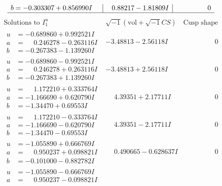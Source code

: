 \documentclass[1p]{elsarticle_modified}
\theoremstyle{definition}
\newcommand{\I}{\sqrt{-1}}
\begin{document}
$$\begin{array}{c|c|c}
\begin{aligned}
b &= -0.303307 + 0.856990 I\end{aligned}
 & \phantom{-}0.88217 - 1.81809 I & \phantom{-0.000000 } 0\\
 \hline 
 \end{array}$$\newpage$$\begin{array}{c|c|c}  
\text{Solutions to }I^u_{1}& \I (\text{vol} + \sqrt{-1}CS) & \text{Cusp shape}\\
 \hline 
\begin{aligned}
u &= -0.689860 + 0.992521 I \\
a &= \phantom{-}0.246278 - 0.263116 I \\
b &= -0.267383 - 1.139260 I\end{aligned}
 & -3.48813 - 2.56118 I & \phantom{-0.000000 } 0 \\ \hline\begin{aligned}
u &= -0.689860 - 0.992521 I \\
a &= \phantom{-}0.246278 + 0.263116 I \\
b &= -0.267383 + 1.139260 I\end{aligned}
 & -3.48813 + 2.56118 I & \phantom{-0.000000 } 0 \\ \hline\begin{aligned}
u &= \phantom{-}1.172210 + 0.333764 I \\
a &= -1.166690 + 0.620790 I \\
b &= -1.34470 + 0.69553 I\end{aligned}
 & \phantom{-}4.39351 + 2.17711 I & \phantom{-0.000000 } 0 \\ \hline\begin{aligned}
u &= \phantom{-}1.172210 - 0.333764 I \\
a &= -1.166690 - 0.620790 I \\
b &= -1.34470 - 0.69553 I\end{aligned}
 & \phantom{-}4.39351 - 2.17711 I & \phantom{-0.000000 } 0 \\ \hline\begin{aligned}
u &= -1.055890 + 0.666769 I \\
a &= \phantom{-}0.950237 + 0.098821 I \\
b &= -0.101000 - 0.882782 I\end{aligned}
 & \phantom{-}0.490665 - 0.628637 I & \phantom{-0.000000 } 0 \\ \hline\begin{aligned}
u &= -1.055890 - 0.666769 I \\
a &= \phantom{-}0.950237 - 0.098821 I \\

\end{aligned}
\end{array}$$
\end{document}
